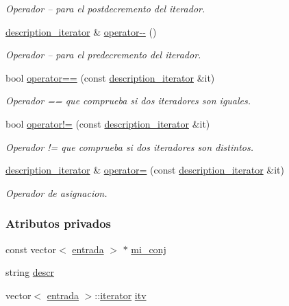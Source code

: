 \begin{DoxyCompactItemize}
\begin{DoxyCompactList}\small\item\em Operador -- para el postdecremento del iterador. \end{DoxyCompactList}\item 
\hyperlink{classconjunto_1_1description__iterator}{description\-\_\-iterator} \& \hyperlink{classconjunto_1_1description__iterator_a5112fc3cf352c2d36544a009e9401a01}{operator-\/-\/} ()
\begin{DoxyCompactList}\small\item\em Operador -- para el predecremento del iterador. \end{DoxyCompactList}\item 
bool \hyperlink{classconjunto_1_1description__iterator_a2345c529afc081064179771f8ab78f4f}{operator==} (const \hyperlink{classconjunto_1_1description__iterator}{description\-\_\-iterator} \&it)
\begin{DoxyCompactList}\small\item\em Operador == que comprueba si dos iteradores son iguales. \end{DoxyCompactList}\item 
bool \hyperlink{classconjunto_1_1description__iterator_a32abef6ce2560b8e042316047aef0572}{operator!=} (const \hyperlink{classconjunto_1_1description__iterator}{description\-\_\-iterator} \&it)
\begin{DoxyCompactList}\small\item\em Operador != que comprueba si dos iteradores son distintos. \end{DoxyCompactList}\item 
\hyperlink{classconjunto_1_1description__iterator}{description\-\_\-iterator} \& \hyperlink{classconjunto_1_1description__iterator_a2e1599c1c023e8effefea77b83d39706}{operator=} (const \hyperlink{classconjunto_1_1description__iterator}{description\-\_\-iterator} \&it)
\begin{DoxyCompactList}\small\item\em Operador de asignacion. \end{DoxyCompactList}\end{DoxyCompactItemize}
\subsubsection*{Atributos privados}
\begin{DoxyCompactItemize}
\item 
const vector$<$ \hyperlink{classconjunto_a09cad766dd65de73e51eae21f9d22585}{entrada} $>$ $\ast$ \hyperlink{classconjunto_1_1description__iterator_a0bb45955205380b163640be067af2cd1}{mi\-\_\-conj}
\item 
string \hyperlink{classconjunto_1_1description__iterator_a3af23f14ec44378308e577ba8c9c71e0}{descr}
\item 
vector$<$ \hyperlink{classconjunto_a09cad766dd65de73e51eae21f9d22585}{entrada} $>$\-::\hyperlink{classconjunto_1_1iterator}{iterator} \hyperlink{classconjunto_1_1description__iterator_ac4c653cecb7c8076a40338775b2b911b}{itv}
\end{DoxyCompactItemize}
